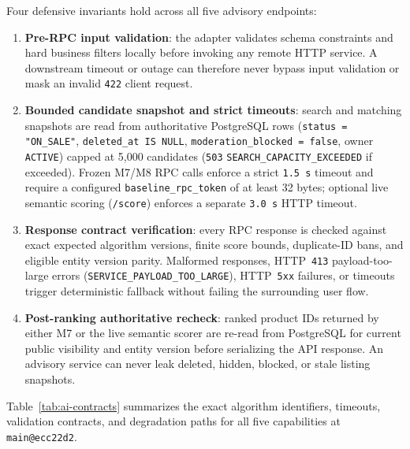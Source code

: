 Four defensive invariants hold across all five advisory endpoints:
\begin{enumerate}
  \item \textbf{Pre-RPC input validation}: the adapter validates schema constraints and hard business filters locally before invoking any remote HTTP service. A downstream timeout or outage can therefore never bypass input validation or mask an invalid \texttt{422} client request.
  \item \textbf{Bounded candidate snapshot and strict timeouts}: search and matching snapshots are read from authoritative PostgreSQL rows (\texttt{status = "ON\_SALE"}, \texttt{deleted\_at IS NULL}, \texttt{moderation\_blocked = false}, owner \texttt{ACTIVE}) capped at 5,000 candidates (\texttt{503} \texttt{SEARCH\_\allowbreak CAPACITY\_\allowbreak EXCEEDED} if exceeded). Frozen M7/M8 RPC calls enforce a strict \texttt{1.5 s} timeout and require a configured \texttt{baseline\_rpc\_token} of at least 32 bytes; optional live semantic scoring (\texttt{/score}) enforces a separate \texttt{3.0 s} HTTP timeout.
  \item \textbf{Response contract verification}: every RPC response is checked against exact expected algorithm versions, finite score bounds, duplicate-ID bans, and eligible entity version parity. Malformed responses, HTTP~\texttt{413} payload-too-large errors (\texttt{SERVICE\_\allowbreak PAYLOAD\_\allowbreak TOO\_\allowbreak LARGE}), HTTP~\texttt{5xx} failures, or timeouts trigger deterministic fallback without failing the surrounding user flow.
  \item \textbf{Post-ranking authoritative recheck}: ranked product IDs returned by either M7 or the live semantic scorer are re-read from PostgreSQL for current public visibility and entity version before serializing the API response. An advisory service can never leak deleted, hidden, blocked, or stale listing snapshots.
\end{enumerate}

Table~\ref{tab:ai-contracts} summarizes the exact algorithm identifiers, timeouts, validation contracts, and degradation paths for all five capabilities at \texttt{main@ecc22d2}.

